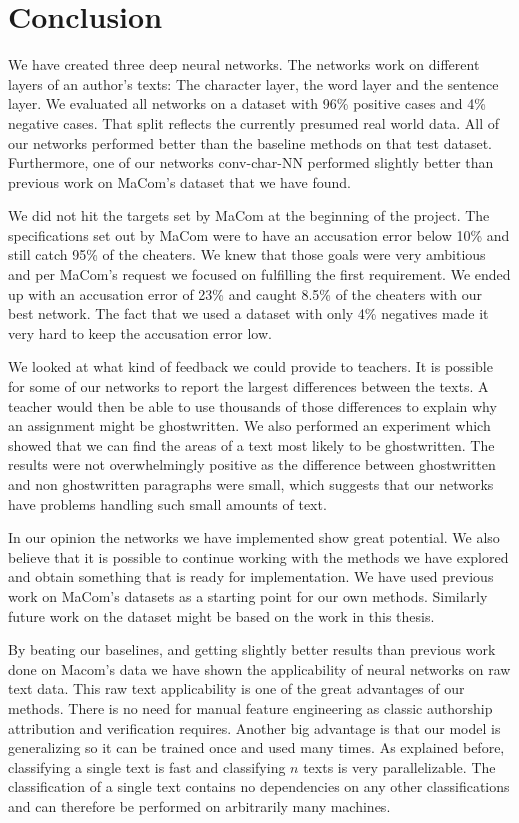 \section{Conclusion} \label{sec:conclusion}

We have created three deep neural networks. The networks work on different
layers of an author's texts: The character layer, the word layer and the
sentence layer. We evaluated all networks on a dataset with 96\% positive cases
and 4\% negative cases. That split reflects the currently presumed real world
data. All of our networks performed better than the baseline methods on that
test dataset. Furthermore, one of our networks \gls{conv-char-NN} performed
slightly better than previous work on MaCom's dataset that we have found.

We did not hit the targets set by MaCom at the beginning of the project. The
specifications set out by MaCom were to have an accusation error below 10\% and
still catch 95\% of the cheaters. We knew that those goals were very ambitious
and per MaCom's request we focused on fulfilling the first requirement. We ended
up with an accusation error of 23\% and caught 8.5\% of the cheaters with our
best network. The fact that we used a dataset with only 4\% negatives made it
very hard to keep the accusation error low.

We looked at what kind of feedback we could provide to teachers. It is possible
for some of our networks to report the largest differences between the texts.
A teacher would then be able to use thousands of those differences to explain
why an assignment might be ghostwritten. We also performed an experiment which
showed that we can find the areas of a text most likely to be ghostwritten. The
results were not overwhelmingly positive as the difference between ghostwritten
and non ghostwritten paragraphs were small, which suggests that our networks
have problems handling such small amounts of text.

In our opinion the networks we have implemented show great potential. We also
believe that it is possible to continue working with the methods we have
explored and obtain something that is ready for implementation. We have used
previous work on MaCom's datasets as a starting point for our own methods.
Similarly future work on the dataset might be based on the work in this thesis.

By beating our baselines, and getting slightly better results than previous work
done on Macom's data we have shown the applicability of neural networks on raw
text data. This raw text applicability is one of the great advantages of our
methods. There is no need for manual feature engineering as classic authorship
attribution and verification requires. Another big advantage is that our model
is generalizing so it can be trained once and used many times. As explained
before, classifying a single text is fast and classifying $n$ texts is very
parallelizable. The classification of a single text contains no dependencies on
any other classifications and can therefore be performed on arbitrarily many
machines.

